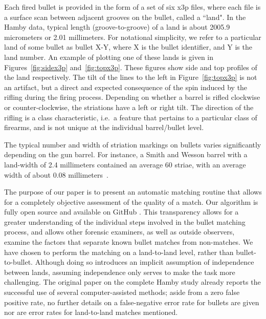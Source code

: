 \documentclass[aoas, preprint]{imsart}\usepackage[]{graphicx}\usepackage[]{color}
\begin{document}
Each fired bullet is provided in the form of a set of six x3p files, where each file is a surface scan between adjacent grooves on the bullet, called a ``land". In the Hamby data, typical length (groove-to-groove) of a land is about 2005.9 micrometers or 2.01 millimeters. For notational simplicity, we refer to a particular land of some bullet as bullet X-Y, where X is the bullet identifier, and Y is the land number. An example of plotting one of these lands is given in Figures~\ref{fig:sidex3p} and~\ref{fig:topx3p}. These figures show side and top profiles of the land respectively. The tilt of the lines to the left in Figure~\ref{fig:topx3p} is not an artifact, but a direct and expected consequence of the spin induced by the rifling during the firing process. Depending on whether a barrel is rifled clockwise or counter-clockwise, the striations have a left or right tilt. The direction of the rifling is a class characteristic, i.e.\ a feature that pertains to a particular class of firearms, and is not unique at the individual barrel/bullet level.

The typical number and width of striation markings on bullets varies significantly depending on the gun barrel. For instance, a Smith and Wesson barrel with a land-width of 2.4 millimeters contained an average 60 striae, with an average width of about 0.08 millimeters~\citep{chu:2011}.

The purpose of our paper is to present an automatic matching routine that allows for a completely objective assessment of the quality of a match. Our algorithm is fully open source and available on GitHub \citep{x3prplus}. This transparency allows for a greater understanding of the individual steps involved in the bullet matching process, and allows other forensic examiners, as well as outside observers, examine the factors that separate known bullet matches from non-matches. We have chosen to perform the matching on a land-to-land level, rather than bullet-to-bullet. Although doing so introduces an implicit assumption of independence between lands, assuming independence only serves to make the task more challenging.
The original paper on the complete Hamby study already reports the successful use of several computer-assisted methods; aside from a zero false positive rate, no further details on a false-negative error rate for bullets are given nor are error rates for land-to-land matches mentioned. 
 
\end{document}
